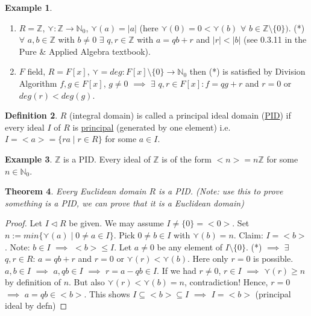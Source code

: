 \documentclass[11pt]{article}
\newtheorem{thm}{Theorem}[section]
\theoremstyle{definition}
\newtheorem{definition}[thm]{Definition}
\newtheorem{example}[thm]{Example}
\numberwithin{equation}{section}
\newcommand{\Z}{\mathbb{Z}}
\newcommand{\N}{\mathbb{N}} %
\begin{document}
\begin{example}
\begin{enumerate}
    \item $R = \Z$, $\curlyvee: \Z \rightarrow \N_{0}$, $\curlyvee(a) = |a|$ (here $\curlyvee(0) = 0 < \curlyvee(b)$ $\forall$ $b \in \Z \setminus \{0\})$. (*) $\forall$ $a, b \in \Z$ with $b \neq 0$ $\exists$ $q, r \in \Z$ with $a = qb + r$ and $|r| < |b|$ (see 0.3.11 in the Pure & Applied Algebra textbook).
    \item $F$ field, $R = F[x]$, $\curlyvee = deg: F[x] \setminus \{0\} \rightarrow \N_{0}$ then (*) is satisfied by Division Algorithm $f, g \in F[x]$, $g \neq 0$ $\implies$ $\exists$ $q, r \in F[x]: f = qg+r$ and $r = 0$ or $deg(r) < deg(g)$.
\end{enumerate}
\end{example}

\begin{definition}
$R$ (integral domain) is called a principal ideal domain (\underline{PID}) if every ideal $I$ of $R$ is \underline{principal} (generated by one element) i.e. $I = <a> = \{ra \mid r \in R\}$ for some $a \in I$.
\end{definition}

\begin{example}
$\Z$ is a PID. Every ideal of $\Z$ is of the form $<n> = n\Z$ for some $n \in \N_{0}$.
\end{example}

\begin{thm}
Every Euclidean domain $R$ is a PID. (Note: use this to prove something is a PID, we can prove that it is a Euclidean domain)
\end{thm}

\begin{proof}
Let $I \vartriangleleft R$ be given. We may assume $I \neq \{0\} = <0>$. Set $n:=min\{\curlyvee(a) \mid 0 \neq a \in I\}$. Pick $0 \neq b \in I$ with $\curlyvee(b) = n$. Claim: $I = <b>$. Note: $b \in I$ $\implies$ $<b> \leq I$. Let $a \neq 0$ be any element of $I \setminus \{0\}$. (*) $\implies$ $\exists$ $q, r \in R$: $a = qb + r$ and $r = 0$ or $\curlyvee(r) < \curlyvee(b)$. Here only $r = 0$ is possible. $a, b \in I$ $\implies$ $a, qb \in I$ $\implies$ $r = a - qb \in I$. If we had $r \neq 0$, $r \in I$ $\implies$ $\curlyvee(r) \geq n$ by definition of $n$. But also $\curlyvee(r) < \curlyvee(b) = n$, contradiction! Hence, $r = 0$ $\implies$ $a = qb \in <b>$. This shows $I \subseteq <b> \subseteq I$ $\implies$ $I = <b>$ (principal ideal by defn)
\end{proof}
\end{document}
